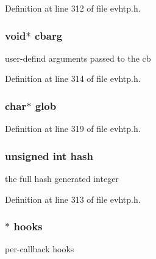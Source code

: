 \-Definition at line 312 of file evhtp.\-h.

\hypertarget{structevhtp__callback__s_aafd3d1a6343925cb274875556a6faa0e}{
\subsubsection[{cbarg}]{\setlength{\rightskip}{0pt plus 5cm}void$\ast$ {\bf cbarg}}}\label{structevhtp__callback__s_aafd3d1a6343925cb274875556a6faa0e}
user-\/defind arguments passed to the cb 

\-Definition at line 314 of file evhtp.\-h.

\hypertarget{structevhtp__callback__s_ac921642f435071137acef3e073973b99}{
\subsubsection[{glob}]{\setlength{\rightskip}{0pt plus 5cm}char$\ast$ {\bf glob}}}\label{structevhtp__callback__s_ac921642f435071137acef3e073973b99}


\-Definition at line 319 of file evhtp.\-h.

\hypertarget{structevhtp__callback__s_a09f9a9ce240560b1d191b42ed56af642}{
\subsubsection[{hash}]{\setlength{\rightskip}{0pt plus 5cm}unsigned int {\bf hash}}}\label{structevhtp__callback__s_a09f9a9ce240560b1d191b42ed56af642}
the full hash generated integer 

\-Definition at line 313 of file evhtp.\-h.

\hypertarget{structevhtp__callback__s_ac97663394f74c9030e57c771cfb7981e}{
\subsubsection[{hooks}]{$\ast$ {\bf hooks}}}\label{structevhtp__callback__s_ac97663394f74c9030e57c771cfb7981e}
per-\/callback hooks 

